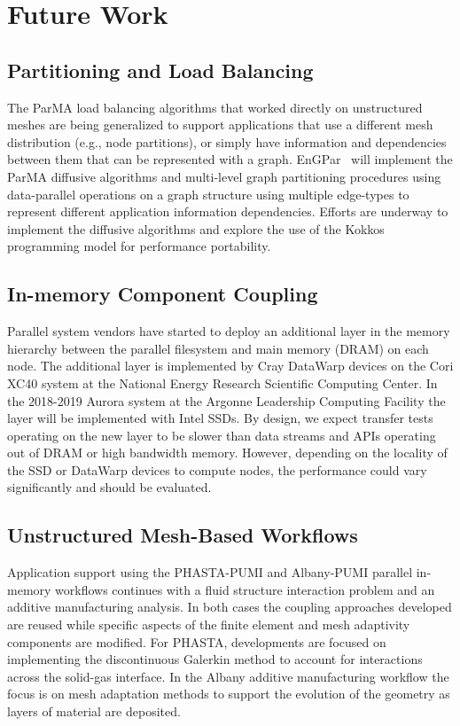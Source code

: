 \section{Future Work}

\subsection{Partitioning and Load Balancing}

The ParMA load balancing algorithms that worked
directly on unstructured meshes are being generalized to support applications
that use a different mesh distribution (e.g., node partitions), or simply have
information and dependencies between them that can be represented with a graph.
EnGPar~\cite{engpar_github} will implement the ParMA diffusive
algorithms and multi-level graph partitioning procedures using data-parallel
operations on a graph structure using multiple edge-types to represent different
application information dependencies.
Efforts are underway to implement the diffusive algorithms and explore the use
of the Kokkos~\cite{edwards2013kokkos} programming model for
performance portability.

\subsection{In-memory Component Coupling}

Parallel system vendors have started to deploy an additional layer
in the memory hierarchy between the parallel filesystem and main memory (DRAM)
on each node.
The additional layer is implemented by Cray DataWarp devices on the Cori
XC40 system at the National Energy Research Scientific Computing Center.
In the 2018-2019 Aurora system at the Argonne Leadership Computing Facility the
layer will be implemented with Intel SSDs.
By design, we expect transfer tests operating on the new layer to be slower
than data streams and APIs operating out of DRAM or high bandwidth memory.
However, depending on the locality of the SSD or DataWarp devices to compute
nodes, the performance could vary significantly and should be evaluated.

\subsection{Unstructured Mesh-Based Workflows}

Application support using the PHASTA-PUMI and Albany-PUMI
parallel in-memory workflows continues with a fluid structure interaction
problem and an additive manufacturing analysis.
In both cases the coupling approaches developed are reused while specific
aspects of the finite element and mesh adaptivity components are modified.
For PHASTA, developments are focused on implementing the discontinuous
Galerkin method to account for interactions across the solid-gas interface.
In the Albany additive manufacturing workflow the focus is on mesh
adaptation methods to support the evolution of the geometry as layers of
material are deposited.

